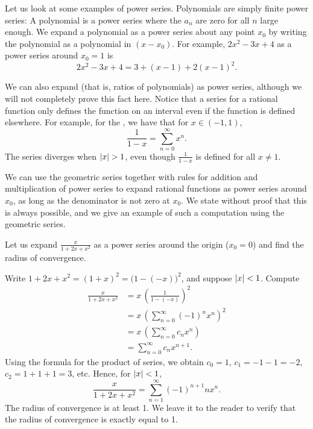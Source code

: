 Let us look at some examples of power series.
Polynomials are simply finite power series:  A polynomial
is a power series where
the $a_n$ are zero for all $n$ large enough.  We expand
a polynomial as a power series about any point $x_0$ by writing
the polynomial as a polynomial in $(x-x_0)$.  For example,
$2x^2-3x+4$ as a power series around $x_0 = 1$ is
\begin{equation*}
2x^2-3x+4 = 3 + (x-1) + 2{(x-1)}^2 .
\end{equation*}

We can also expand
\emph{} (that is, ratios of polynomials)
as power series, although we will not completely prove this fact here.
Notice that a series for a rational function only defines the function
on an interval even if the function is defined elsewhere.  For example, for
the \emph{}, we have that for
$x \in (-1,1)$,
\begin{equation*}
\frac{1}{1-x} =
\sum_{n=0}^\infty x^n .
\end{equation*}
The series diverges when $\lvert {x} \rvert > 1$, even though $\frac{1}{1-x}$ is
defined for all $x \neq 1$.

We can use the geometric series together with rules for addition and
multiplication of power series to expand rational functions as power
series around $x_0$,
as long as the denominator is not zero at $x_0$.  We state without
proof that this is always possible, and we give an example of such
a computation using the geometric series.

\begin{example}
Let us expand $\frac{x}{1+2x+x^2}$ as a power series around the origin ($x_0 = 0$) and
find the radius of convergence.

Write $1+2x+x^2 = {(1+x)}^2 = {\bigl(1-(-x)\bigr)}^2$, and suppose
$\lvert {x} \rvert < 1$.  Compute
\begin{equation*}
\begin{split}
\frac{x}{1+2x+x^2}
&=
x \,
{\left(
\frac{1}{1-(-x)}
\right)}^2
\\
&=
x \,
{\left( 
\sum_{n=0}^\infty {(-1)}^n x^n 
\right)}^2
\\
&=
x \,
\left(
\sum_{n=0}^\infty c_n x^n 
\right)
\\
&=
\sum_{n=0}^\infty c_n x^{n+1} .
\end{split}
\end{equation*}
Using the formula for the product of series,
we obtain $c_0 = 1$, $c_1 = -1 -1 = -2$, $c_2 = 1+1+1 = 3$, etc.
Hence, for $\lvert {x} \rvert < 1$, 
\begin{equation*}
\frac{x}{1+2x+x^2}
=
\sum_{n=1}^\infty {(-1)}^{n+1} n x^n .
\end{equation*}
The radius of convergence is at least 1.  We leave it to the reader to
verify that the radius of convergence is exactly equal to 1.
\end{example}

